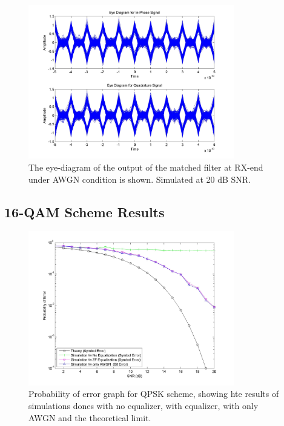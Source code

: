 \documentclass[]{article}
\begin{document}
\begin{figure}[H]
\centering
\includegraphics[width=0.8\textwidth]{awgn_eye_qpsk20.jpg}
\caption{The eye-diagram of the output of the matched filter at RX-end under AWGN condition is shown. Simulated at 20 dB SNR. \label{fig:qpEyeAWGN}}
\end{figure}

\subsection{16-QAM Scheme Results}

\begin{figure}[H]
\centering
\includegraphics[width=0.8\textwidth]{qam16SNR.jpg}
\caption{Probability of error graph for QPSK scheme, showing hte results of simulations dones with no equalizer, with equalizer, with only AWGN and the theoretical limit. \label{fig:qamBER}}
\end{figure}
\end{document}

